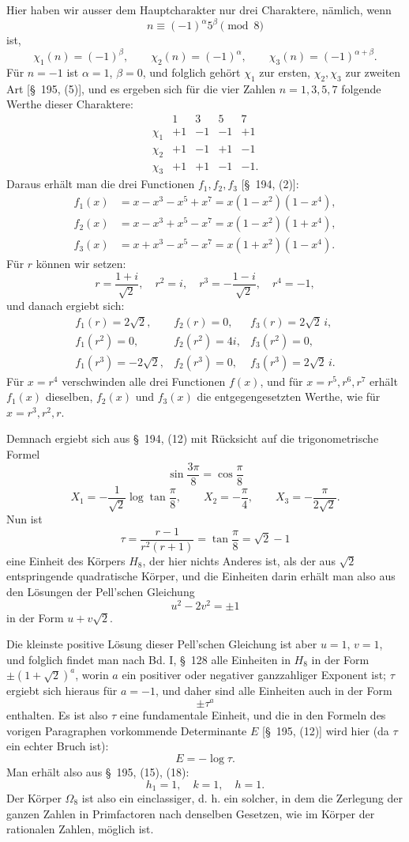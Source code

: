 \documentclass[11pt]{article}
\begin{document}
Hier haben wir ausser dem Hauptcharakter nur drei Charaktere, nämlich, wenn
\[
n\equiv(-1)^\alpha5^\beta\pmod8
\]
ist,
\[
\chi_1(n)=(-1)^\beta,
\qquad
\chi_2(n)=(-1)^\alpha,
\qquad
\chi_3(n)=(-1)^{\alpha+\beta}.
\]
Für $n=-1$ ist $\alpha=1$, $\beta=0$, und folglich gehört $\chi_1$ zur ersten, $\chi_2,\chi_3$ zur zweiten Art [\S~195, (5)], und es ergeben sich für die vier Zahlen $n=1,3,5,7$ folgende Werthe dieser Charaktere:
\[
\begin{array}{c|rrrr}
&1&3&5&7\\\hline
\chi_1&+1&-1&-1&+1\\
\chi_2&+1&-1&+1&-1\\
\chi_3&+1&+1&-1&-1.
\end{array}
\]
Daraus erhält man die drei Functionen $f_1,f_2,f_3$ [\S~194, (2)]:
\[
\begin{aligned}
f_1(x)&=x-x^3-x^5+x^7=x(1-x^2)(1-x^4),\\
f_2(x)&=x-x^3+x^5-x^7=x(1-x^2)(1+x^4),\\
f_3(x)&=x+x^3-x^5-x^7=x(1+x^2)(1-x^4).
\end{aligned}
\]
Für $r$ können wir setzen:
\[
r=\frac{1+i}{\sqrt2},\quad r^2=i,
\quad r^3=-\frac{1-i}{\sqrt2},\quad r^4=-1,
\]
und danach ergiebt sich:
\[
\begin{array}{lll}
f_1(r)=2\sqrt2,& f_2(r)=0,& f_3(r)=2\sqrt2\,i,\\
f_1(r^2)=0,& f_2(r^2)=4i,& f_3(r^2)=0,\\
f_1(r^3)=-2\sqrt2,& f_2(r^3)=0,& f_3(r^3)=2\sqrt2\,i.
\end{array}
\]
Für $x=r^4$ verschwinden alle drei Functionen $f(x)$, und für $x=r^5,r^6,r^7$ erhält $f_1(x)$ dieselben, $f_2(x)$ und $f_3(x)$ die entgegengesetzten Werthe, wie für $x=r^3,r^2,r$.

Demnach ergiebt sich aus \S~194, (12) mit Rücksicht auf die trigonometrische Formel
\[
\sin\frac{3\pi}{8}=\cos\frac\pi8
\]
\[
X_1=-\frac1{\sqrt2}\log\tan\frac\pi8,
\qquad
X_2=-\frac\pi4,
\qquad
X_3=-\frac\pi{2\sqrt2}.
\]
Nun ist
\[
\tau=\frac{r-1}{r^2(r+1)}=\tan\frac\pi8=\sqrt2-1
\]
eine Einheit des Körpers $H_8$, der hier nichts Anderes ist, als der aus $\sqrt2$ entspringende quadratische Körper, und die Einheiten darin erhält man also aus den Lösungen der Pell'schen Gleichung
\[
u^2-2v^2=\pm1
\]
in der Form $u+v\sqrt2$.

Die kleinste positive Lösung dieser Pell'schen Gleichung ist aber $u=1$, $v=1$, und folglich findet man nach Bd. I, \S~128 alle Einheiten in $H_8$ in der Form $\pm(1+\sqrt2)^a$, worin $a$ ein positiver oder negativer ganzzahliger Exponent ist; $\tau$ ergiebt sich hieraus für $a=-1$, und daher sind alle Einheiten auch in der Form
\[
\pm\tau^a
\]
enthalten. Es ist also $\tau$ eine fundamentale Einheit, und die in den Formeln des vorigen Paragraphen vorkommende Determinante $E$ [\S~195, (12)] wird hier (da $\tau$ ein echter Bruch ist):
\[
E=-\log\tau.
\]
Man erhält also aus \S~195, (15), (18):
\[
h_1=1,\quad k=1,\quad h=1.
\]
Der Körper $\Omega_8$ ist also ein einclassiger, d. h. ein solcher, in dem die Zerlegung der ganzen Zahlen in Primfactoren nach denselben Gesetzen, wie im Körper der rationalen Zahlen, möglich ist.
\end{document}
